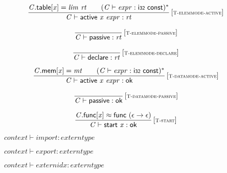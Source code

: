 $$
\begin{array}{@{}c@{}}\displaystyle
\frac{
{\mathit{C}}.\mathsf{table}[{\mathit{x}}] = {\mathit{lim}}~{\mathit{rt}}
 \qquad
({\mathit{C}} \vdash {\mathit{expr}} : \mathsf{i{\scriptstyle32}}~\mathsf{const})^\ast
}{
{\mathit{C}} \vdash \mathsf{active}~{\mathit{x}}~{\mathit{expr}} : {\mathit{rt}}
} \, {[\textsc{\scriptsize T{-}elemmode{-}active}]}
\qquad
\end{array}
$$

$$
\begin{array}{@{}c@{}}\displaystyle
\frac{
}{
{\mathit{C}} \vdash \mathsf{passive} : {\mathit{rt}}
} \, {[\textsc{\scriptsize T{-}elemmode{-}passive}]}
\qquad
\end{array}
$$

$$
\begin{array}{@{}c@{}}\displaystyle
\frac{
}{
{\mathit{C}} \vdash \mathsf{declare} : {\mathit{rt}}
} \, {[\textsc{\scriptsize T{-}elemmode{-}declare}]}
\qquad
\end{array}
$$

$$
\begin{array}{@{}c@{}}\displaystyle
\frac{
{\mathit{C}}.\mathsf{mem}[{\mathit{x}}] = {\mathit{mt}}
 \qquad
({\mathit{C}} \vdash {\mathit{expr}} : \mathsf{i{\scriptstyle32}}~\mathsf{const})^\ast
}{
{\mathit{C}} \vdash \mathsf{active}~{\mathit{x}}~{\mathit{expr}} : \mathsf{ok}
} \, {[\textsc{\scriptsize T{-}datamode{-}active}]}
\qquad
\end{array}
$$

$$
\begin{array}{@{}c@{}}\displaystyle
\frac{
}{
{\mathit{C}} \vdash \mathsf{passive} : \mathsf{ok}
} \, {[\textsc{\scriptsize T{-}datamode{-}passive}]}
\qquad
\end{array}
$$

$$
\begin{array}{@{}c@{}}\displaystyle
\frac{
{\mathit{C}}.\mathsf{func}[{\mathit{x}}] \approx \mathsf{func}~(\epsilon \rightarrow \epsilon)
}{
{\mathit{C}} \vdash \mathsf{start}~{\mathit{x}} : \mathsf{ok}
} \, {[\textsc{\scriptsize T{-}start}]}
\qquad
\end{array}
$$

\vspace{1ex}

$\boxed{{\mathit{context}} \vdash {\mathit{import}} : {\mathit{externtype}}}$

$\boxed{{\mathit{context}} \vdash {\mathit{export}} : {\mathit{externtype}}}$

$\boxed{{\mathit{context}} \vdash {\mathit{externidx}} : {\mathit{externtype}}}$

